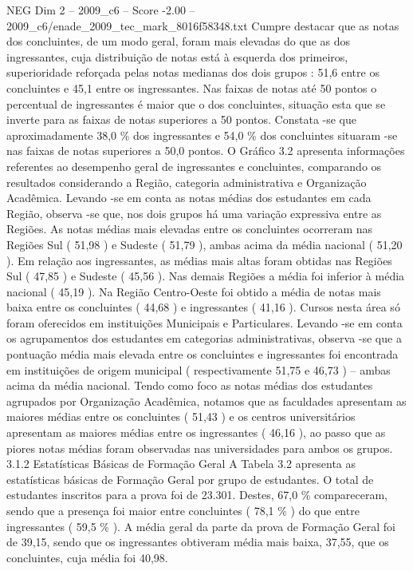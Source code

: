 \begin{textsample}{NEG Dim 2 – 2009\_c6 – Score -2.00 – 2009\_c6/enade\_2009\_tec\_mark\_8016f58348.txt}
Cumpre destacar que as notas dos concluintes, de um modo geral, foram mais elevadas do que as dos ingressantes, cuja distribuição de notas está à esquerda dos primeiros, superioridade reforçada pelas notas medianas dos dois grupos : 51,6 entre os concluintes e 45,1 entre os ingressantes.
Nas faixas de notas até 50 pontos o percentual de ingressantes é maior que o dos concluintes, situação esta que se inverte para as faixas de notas superiores a 50 pontos.
Constata -se que aproximadamente 38,0 \% dos ingressantes e 54,0 \% dos concluintes situaram -se nas faixas de notas superiores a 50,0 pontos.
O Gráfico 3.2 apresenta informações referentes ao desempenho geral de ingressantes e concluintes, comparando os resultados considerando a Região, categoria administrativa e Organização Acadêmica.
Levando -se em conta as notas médias dos estudantes em cada Região, observa -se que, nos dois grupos há uma variação expressiva entre as Regiões.
As notas médias mais elevadas entre os concluintes ocorreram nas Regiões Sul ( 51,98 ) e Sudeste ( 51,79 ), ambas acima da média nacional ( 51,20 ).
Em relação aos ingressantes, as médias mais altas foram obtidas nas Regiões Sul ( 47,85 ) e Sudeste ( 45,56 ).
Nas demais Regiões a média foi inferior à média nacional ( 45,19 ).
Na Região Centro-Oeste foi obtido a média de notas mais baixa entre os concluintes ( 44,68 ) e ingressantes ( 41,16 ).
Cursos nesta área só foram oferecidos em instituições Municipais e Particulares.
Levando -se em conta os agrupamentos dos estudantes em categorias administrativas, observa -se que a pontuação média mais elevada entre os concluintes e ingressantes foi encontrada em instituições de origem municipal ( respectivamente 51,75 e 46,73 ) – ambas acima da média nacional.
Tendo como foco as notas médias dos estudantes agrupados por Organização Acadêmica, notamos que as faculdades apresentam as maiores médias entre os concluintes ( 51,43 ) e os centros universitários apresentam as maiores médias entre os ingressantes ( 46,16 ), ao passo que as piores notas médias foram observadas nas universidades para ambos os grupos. 3.1.2 Estatísticas Básicas de Formação Geral A Tabela 3.2 apresenta as estatísticas básicas de Formação Geral por grupo de estudantes.
O total de estudantes inscritos para a prova foi de 23.301.
Destes, 67,0 \% compareceram, sendo que a presença foi maior entre concluintes ( 78,1 \% ) do que entre ingressantes ( 59,5 \% ).
A média geral da parte da prova de Formação Geral foi de 39,15, sendo que os ingressantes obtiveram média mais baixa, 37,55, que os concluintes, cuja média foi 40,98.

\end{textsample}
